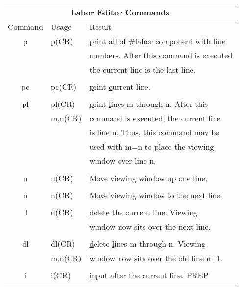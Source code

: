 \begin{table}
\begin{center}
\begin{tabular}{|c|l|l|} \hline
\multicolumn{3}{|c|}{Labor Editor Commands} \\ \hline
 Command &   Usage     & Result \\ \hline
    p    &   p(CR)     & {\underline p}rint all of \#labor component with line \\
         &             & numbers.  After this command is executed \\
         &             & the current line is the last line. \\
         &             & \\
   pc    &   pc(CR)    & {\underline p}rint {\underline c}urrent line. \\
         &             & \\
   pl    &   pl(CR)    & {\underline p}rint {\underline l}ines m through n. After this \\
         &   m,n(CR)   & command is executed, the current line  \\
         &             & is line n.  Thus, this command may be  \\
         &             & used with m=n to place the viewing \\
         &             & window over line n. \\
         &             & \\
    u    &   u(CR)     & Move viewing window {\underline u}p one line. \\
         &             & \\
    n    &   n(CR)     & Move viewing window to the {\underline n}ext line. \\
         &             & \\
    d    &   d(CR)     & {\underline d}elete the current line.  Viewing  \\
         &             & window now sits over the next line.  \\
         &             & \\
   dl    &   dl(CR)    & {\underline d}elete {\underline l}ines m through n.  Viewing \\
         &   m,n(CR)   & window now sits over the old line n+1. \\
         &             & \\
    i    &   i(CR)     & {\underline i}nput after the current line.  PREP  \\

\end{tabular}
\end{center}
\end{table}
